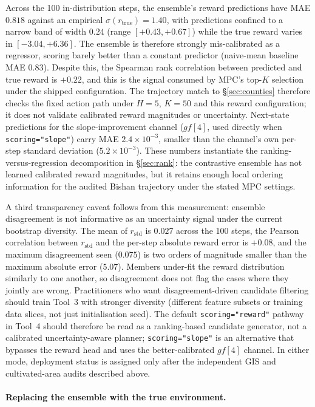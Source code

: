 \documentclass[11pt]{article}
\begin{document}
Across the 100 in-distribution steps, the ensemble's reward predictions have MAE $0.818$ against an empirical $\sigma(r_{\text{true}})=1.40$, with predictions confined to a narrow band of width $0.24$ (range $[+0.43, +0.67]$) while the true reward varies in $[-3.04, +6.36]$. The ensemble is therefore strongly mis-calibrated as a regressor, scoring barely better than a constant predictor (naive-mean baseline MAE $0.83$). Despite this, the Spearman rank correlation between predicted and true reward is $+0.22$, and this is the signal consumed by MPC's top-$K$ selection under the shipped configuration. The trajectory match to \S\ref{sec:counties} therefore checks the fixed action path under $H{=}5$, $K{=}50$ and this reward configuration; it does not validate calibrated reward magnitudes or uncertainty. Next-state predictions for the slope-improvement channel ($gf[4]$, used directly when \texttt{scoring="slope"}) carry MAE $2.4\times 10^{-3}$, smaller than the channel's own per-step standard deviation ($5.2\times 10^{-3}$). These numbers instantiate the ranking-versus-regression decomposition in \S\ref{sec:rank}: the contrastive ensemble has not learned calibrated reward magnitudes, but it retains enough local ordering information for the audited Bishan trajectory under the stated MPC settings.

A third transparency caveat follows from this measurement: ensemble disagreement is not informative as an uncertainty signal under the current bootstrap diversity. The mean of $r_{\text{std}}$ is $0.027$ across the 100 steps, the Pearson correlation between $r_{\text{std}}$ and the per-step absolute reward error is $+0.08$, and the maximum disagreement seen ($0.075$) is two orders of magnitude smaller than the maximum absolute error ($5.07$). Members under-fit the reward distribution similarly to one another, so disagreement does not flag the cases where they jointly are wrong. Practitioners who want disagreement-driven candidate filtering should train Tool~3 with stronger diversity (different feature subsets or training data slices, not just initialisation seed). The default \texttt{scoring="reward"} pathway in Tool~4 should therefore be read as a ranking-based candidate generator, not a calibrated uncertainty-aware planner; \texttt{scoring="slope"} is an alternative that bypasses the reward head and uses the better-calibrated $gf[4]$ channel. In either mode, deployment status is assigned only after the independent GIS and cultivated-area audits described above.

\paragraph{Replacing the ensemble with the true environment.}\label{sec:methods-trueenv}
\end{document}
